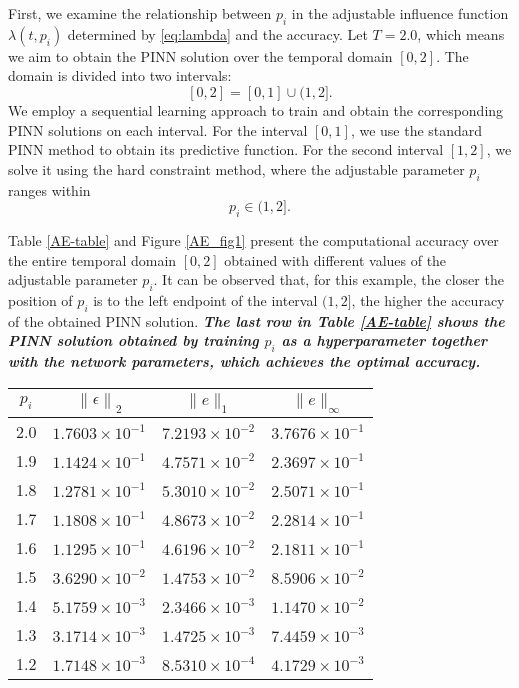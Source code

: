 \documentclass[preprint]{elsarticle}
\numberwithin{table}{section}
\numberwithin{equation}{section}
\numberwithin{figure}{section}
\begin{document}
\begin{CJK}{UTF8}{gbsn}
First, we examine the relationship between   $p_i$
   in the adjustable influence function $\lambda(t,p_i)$ determined by \eqref{eq:lambda} and the accuracy. Let $T=2.0$, which means we aim to obtain the PINN solution over the temporal domain 
 $[0,2]$. The  domain  is divided into two intervals: $$[0,2]=[0,1]\cup(1,2].$$
  We employ a sequential learning approach to train and obtain the corresponding PINN solutions on each interval.
For the interval $[0,1]$, we use the standard PINN method to obtain its predictive function. For the second interval $[1,2]$, we solve it using the hard constraint method, where the adjustable parameter $p_i$
  ranges within $$p_i\in(1,2].$$
  
Table \ref{AE-table} and Figure \ref{AE_fig1}  present the computational accuracy over the entire temporal domain  $[0,2]$ obtained with different values of the adjustable parameter  $p_i$. It can be observed that, for this example, the closer the position of  $p_i$
  is to the left endpoint of the interval $(1,2]$, the higher the accuracy of the obtained PINN solution.
\textbf{\textit{The last row in Table \ref{AE-table} shows the PINN solution obtained by training $p_i$
  as a hyperparameter together with the network parameters, which achieves the optimal accuracy.}}
 \begin{table}[htbp]
    \centering
    \begin{tabular}{c|ccc}
        \hline
        $p_i$ &  $\left\|\epsilon\right\|_{2}$  & $\|e\|_1 $ & $\|e\|_\infty$ \\ 
        \hline
2.0 & $1.7603 \times 10^{-1}$ & $7.2193 \times 10^{-2}$ & $3.7676 \times 10^{-1}$ \\
1.9 & $1.1424 \times 10^{-1}$ & $4.7571 \times 10^{-2}$ & $2.3697 \times 10^{-1}$ \\
1.8 & $1.2781 \times 10^{-1}$ & $5.3010 \times 10^{-2}$ & $2.5071 \times 10^{-1}$ \\
1.7 & $1.1808 \times 10^{-1}$ & $4.8673 \times 10^{-2}$ & $2.2814 \times 10^{-1}$ \\
1.6 & $1.1295 \times 10^{-1}$ & $4.6196 \times 10^{-2}$ & $2.1811 \times 10^{-1}$ \\
1.5 & $3.6290 \times 10^{-2}$ & $1.4753 \times 10^{-2}$ & $8.5906 \times 10^{-2}$ \\
1.4 & $5.1759 \times 10^{-3}$ & $2.3466 \times 10^{-3}$ & $1.1470 \times 10^{-2}$ \\
1.3 & $3.1714 \times 10^{-3}$ & $1.4725 \times 10^{-3}$ & $7.4459 \times 10^{-3}$ \\
1.2 & $1.7148 \times 10^{-3}$ & $8.5310 \times 10^{-4}$ & $4.1729 \times 10^{-3}$ \\

\end{tabular}
\end{table}
\end{CJK}
\end{document}
